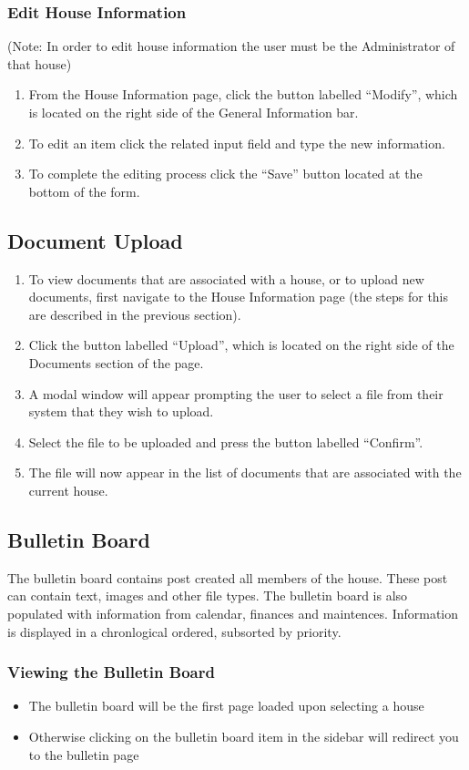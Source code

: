 \documentclass[12pt]{article}
\begin{document}
\subsubsection{Edit House Information}
(Note: In order to edit house information the user must be the Administrator of that house)
\begin{enumerate}
\item From the House Information page, click the button labelled ``Modify'', which is located on the right side of the General Information bar.
\item To edit an item click the related input field and type the new information.
\item To complete the editing process click the ``Save'' button located at the bottom of the form.
\end{enumerate}

\subsection{Document Upload} %
\begin{enumerate}
\item To view documents that are associated with a house, or to upload new documents, first navigate to the House Information page (the steps for this are described in the previous section).
\item Click the button labelled ``Upload'', which is located on the right side of the Documents section of the page.
\item A modal window will appear prompting the user to select a file from their system that they wish to upload.
\item Select the file to be uploaded and press the button labelled ``Confirm''.
\item The file will now appear in the list of documents that are associated with the current house.
\end{enumerate}

\subsection{Bulletin Board}
The bulletin board contains post created all members of the house. These post can contain text, images and other file types.
The bulletin board is also populated with information from calendar, finances and maintences.
Information is displayed in a chronlogical ordered, subsorted by priority.

\subsubsection{Viewing the Bulletin Board}
\begin{itemize}
\item The bulletin board will be the first page loaded upon selecting a house
\item Otherwise clicking on the bulletin board item in the sidebar will redirect you to the bulletin page
\end{itemize}
\end{document}
